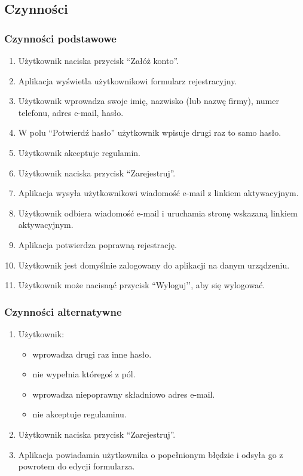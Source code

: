 \documentclass[12pt,a4paper,twoside]{article}
\begin{document}
    
    \subsection{Czynności}
    
    
    \subsubsection{Czynności podstawowe}
    
    
    \begin{enumerate}
        \item Użytkownik naciska przycisk ``Załóż konto''.
        \item Aplikacja wyświetla użytkownikowi formularz rejestracyjny.
        \item Użytkownik wprowadza swoje imię, nazwisko (lub nazwę firmy), numer telefonu, adres e-mail, hasło.
        \item W polu ``Potwierdź hasło'' użytkownik wpisuje drugi raz to samo hasło.
        \item Użytkownik akceptuje regulamin.
        \item Użytkownik naciska przycisk ``Zarejestruj''.
        \item Aplikacja wysyła użytkownikowi wiadomość e-mail z linkiem aktywacyjnym.
        \item Użytkownik odbiera wiadomość e-mail i uruchamia stronę wskazaną linkiem aktywacyjnym.
        \item Aplikacja potwierdza poprawną rejestrację.
     \item Użytkownik jest domyślnie zalogowany do aplikacji na danym urządzeniu.
     \item Użytkownik może nacisnąć przycisk ``Wyloguj’’, aby się wylogować.
    \end{enumerate}
    
    
    \subsubsection{Czynności alternatywne}
    
    
    \begin{enumerate}
        \item Użytkownik:
        \begin{itemize}
            \item wprowadza drugi raz inne hasło.
            \item nie wypełnia któregoś z pól.
            \item wprowadza niepoprawny składniowo adres e-mail.
            \item nie akceptuje regulaminu.
        \end{itemize}
        \item Użytkownik naciska przycisk ``Zarejestruj''.
        \item Aplikacja powiadamia użytkownika o popełnionym błędzie i odsyła go z powrotem do edycji formularza.
    \end{enumerate}
    
\end{document}
